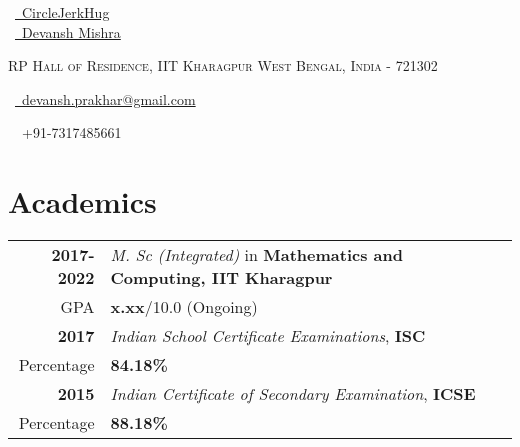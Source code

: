 \documentclass[a4paper,10pt]{extarticle} %
\begin{document}
\pagestyle{empty} %


\begin{multicols}{3}

\normalsize \faGithub\ {\href{https://github.com/CircleJerkHug}{\    CircleJerkHug}}\\
\normalsize  \faLinkedinSquare\ {\href{https://www.linkedin.com/in/devansh-mishra-b3040453/}{\ Devansh Mishra}}\\
\columnbreak
\normalsize\par{\centering{\huge\textsc{\textcolor{primary}{Devansh Mishra}}}\par} %
\par{\centering\normalsize {\textsc{RP Hall of Residence, IIT Kharagpur    West Bengal, India - 721302}}\hfill\par}
\columnbreak
\raggedright\hfill\normalsize \faEnvelope\ {\href{mailto:devansh.prakhar@gmail.com}{\  devansh.prakhar@gmail.com}}\\
\raggedright\hfill{\faPhone\ \  +91-7317485661}
\end{multicols}
\vspace{-0.4 cm}


\vspace{-0.4cm}
\section{\textcolor{primary}{Academics}}

\begin{tabular}{r|p{17.5cm}}	
\textbf{2017-2022} & \textit{M. Sc (Integrated)} in \textbf{Mathematics and Computing, IIT Kharagpur}\\
\hfill GPA & \textbf{x.xx}/10.0 (Ongoing)\\
\textbf{2017} & \textit{Indian School Certificate Examinations}, \textbf{ISC}\\
\hfill Percentage & \textbf{84.18\%}\\
\textbf{2015} & \textit{Indian Certificate of Secondary Examination}, \textbf{ICSE}\\
\hfill Percentage & \textbf{88.18\%} \\
\end{tabular}
\end{document}
